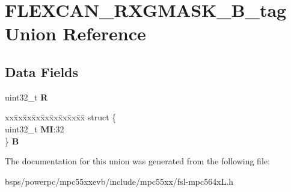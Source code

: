 \hypertarget{unionFLEXCAN__RXGMASK__32B__tag}{}\section{F\+L\+E\+X\+C\+A\+N\+\_\+\+R\+X\+G\+M\+A\+S\+K\+\_\+B\+\_\+tag Union Reference}
\label{unionFLEXCAN__RXGMASK__32B__tag}
\subsection*{Data Fields}
\begin{DoxyCompactItemize}
\item 
\mbox{\label{unionFLEXCAN__RXGMASK__32B__tag_a798bea59d4a11af5f002ed1aae7760e1}} 
uint32\+\_\+t {\bfseries R}
\item 
\mbox{\label{unionFLEXCAN__RXGMASK__32B__tag_aba11ad229a06cdf8a4f3390bc4674226}} 
\begin{tabbing}
xx\=xx\=xx\=xx\=xx\=xx\=xx\=xx\=xx\=\kill
struct \{\\
\>uint32\_t {\bfseries MI}:32\\
\} {\bfseries B}\\

\end{tabbing}\end{DoxyCompactItemize}


The documentation for this union was generated from the following file\+:\begin{DoxyCompactItemize}
\item 
bsps/powerpc/mpc55xxevb/include/mpc55xx/fsl-\/mpc564x\+L.\+h\end{DoxyCompactItemize}
